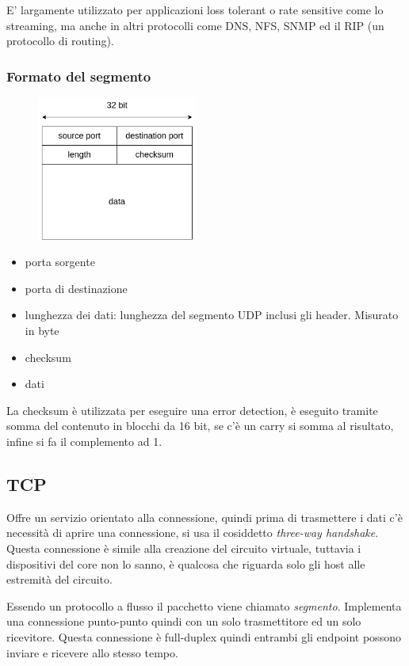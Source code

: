E' largamente utilizzato per applicazioni loss tolerant o rate sensitive come lo streaming, ma anche in altri protocolli come DNS, NFS, SNMP ed il RIP (un protocollo di routing).

\subsubsection{Formato del segmento}
\begin{figure}[H]
    \centering
    \includegraphics[width=200px]{images/6_Trasporto/udp_segment.png}
\end{figure}

\begin{itemize}
    \item porta sorgente
    \item porta di destinazione
    \item lunghezza dei dati: lunghezza del segmento UDP inclusi gli header. Misurato in byte
    \item checksum
    \item dati
\end{itemize}
La checksum è utilizzata per eseguire una error detection, è eseguito tramite somma del contenuto in blocchi da 16 bit, se c'è un carry si somma al risultato, infine si fa il complemento ad 1.


\subsection{TCP}
Offre un servizio orientato alla connessione, quindi prima di trasmettere i dati c'è necessità di aprire una connessione, si usa il cosiddetto \emph{three-way handshake}.
Questa connessione è simile alla creazione del circuito virtuale, tuttavia i dispositivi del core non lo sanno, è qualcosa che riguarda solo gli host alle estremità del circuito.

Essendo un protocollo a flusso il pacchetto viene chiamato \emph{segmento}.
Implementa una connessione punto-punto quindi con un solo trasmettitore ed un solo ricevitore.
Questa connessione è full-duplex quindi entrambi gli endpoint possono inviare e ricevere allo stesso tempo.


